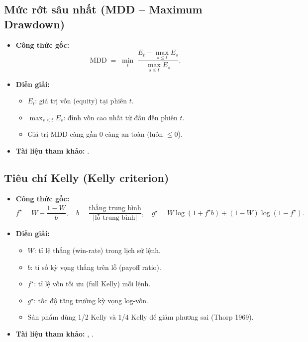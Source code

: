 \documentclass[12pt,a4paper,openany,oneside]{report}
\numberwithin{equation}{chapter}
\begin{document}
\subsection{Mức rớt sâu nhất (MDD -- Maximum Drawdown)}
\begin{itemize}[leftmargin=18pt,topsep=2pt,itemsep=3pt]
  \item \textbf{Công thức gốc:}
        \begin{equation}
          \mathrm{MDD} \;=\; \min_{t}\;
          \frac{E_t - \max_{s \le t} E_s}{\max_{s \le t} E_s}.
          \label{eq:mdd}
        \end{equation}
  \item \textbf{Diễn giải:}
        \begin{itemize}[leftmargin=14pt,topsep=2pt,itemsep=1pt]
          \item $E_t$: giá trị vốn (equity) tại phiên $t$.
          \item $\max_{s \le t} E_s$: đỉnh vốn cao nhất từ đầu đến phiên $t$.
          \item Giá trị MDD càng gần 0 càng an toàn (luôn $\le 0$).
        \end{itemize}
  \item \textbf{Tài liệu tham khảo:} \citet{MagdonIsmail2004}.
\end{itemize}

\subsection{Tiêu chí Kelly (Kelly criterion)}
\begin{itemize}[leftmargin=18pt,topsep=2pt,itemsep=3pt]
  \item \textbf{Công thức gốc:}
        \begin{equation}
          f^{\star} = W - \frac{1 - W}{b},\quad
          b = \frac{\text{thắng trung bình}}{|\text{lỗ trung bình}|},\quad
          g^{\star} = W \log(1 + f^{\star}b) + (1 - W)\log(1 - f^{\star}).
          \label{eq:kelly}
        \end{equation}
  \item \textbf{Diễn giải:}
        \begin{itemize}[leftmargin=14pt,topsep=2pt,itemsep=1pt]
          \item $W$: tỉ lệ thắng (win-rate) trong lịch sử lệnh.
          \item $b$: tỉ số kỳ vọng thắng trên lỗ (payoff ratio).
          \item $f^{\star}$: tỉ lệ vốn tối ưu (full Kelly) mỗi lệnh.
          \item $g^{\star}$: tốc độ tăng trưởng kỳ vọng log-vốn.
          \item Sản phẩm dùng 1/2 Kelly và 1/4 Kelly để giảm phương sai
                (Thorp 1969).
        \end{itemize}
  \item \textbf{Tài liệu tham khảo:} \citet{Kelly1956}, \citet{Thorp1969}.
\end{itemize}
\end{document}
